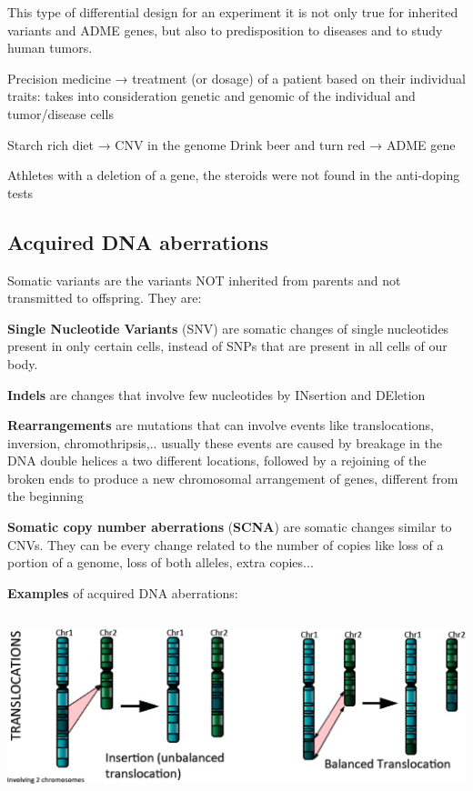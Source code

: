 This type of differential design for an experiment it is not only true for
inherited variants and ADME genes, but also to predisposition to diseases and to
study human tumors.

Precision medicine → treatment (or dosage) of a patient based on their
individual traits: takes into consideration genetic and genomic of the
individual and tumor/disease cells

Starch rich diet → CNV in the genome Drink beer and turn red → ADME gene

Athletes with a deletion of a gene, the steroids were not found in the
anti-doping tests


\hypertarget{acquired-dna-aberrations}{%
\subsection{Acquired DNA aberrations}\label{acquired-dna-aberrations}}


Somatic variants are the variants NOT inherited from parents and not transmitted
to offspring. They are:

\textbf{Single Nucleotide Variants} (SNV) are somatic changes of single
nucleotides present in only certain cells, instead of SNPs that are present in
all cells of our body.

\textbf{Indels} are changes that involve few nucleotides by INsertion and
DEletion

\textbf{Rearrangements} are mutations that can involve events like
translocations, inversion, chromothripsis,.. usually these events are caused by
breakage in the DNA double helices a two different locations, followed by a
rejoining of the broken ends to produce a new chromosomal arrangement of genes,
different from the beginning

\textbf{Somatic copy number aberrations} (\textbf{SCNA}) are somatic changes
similar to CNVs. They can be every change related to the number of copies like
loss of a portion of a genome, loss of both alleles, extra copies...

\textbf{Examples} of acquired DNA aberrations:


\includegraphics[width=6.1748in,height=2.09646in]{image6.jpeg}


